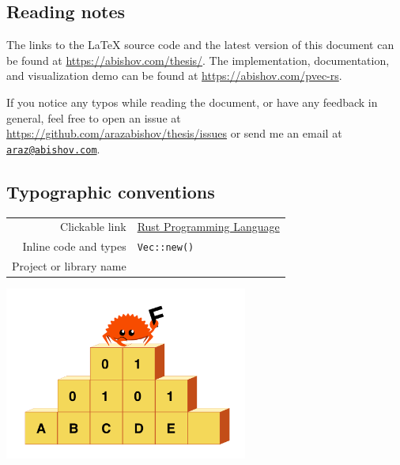 \vspace*{2cm}
\thispagestyle{plain}

\begin{center}

    \section*{Reading notes}
    \begin{justify}
        The links to the LaTeX source code and the latest version of this document can be found at \url{https://abishov.com/thesis/}. The implementation, documentation, and visualization demo can be found at \url{https://abishov.com/pvec-rs}.

        If you notice any typos while reading the document, or have any feedback in general, feel free to open an issue at \url{https://github.com/arazabishov/thesis/issues} or send me an email at \href{mailto:araz@abishov.com}{\nolinkurl{araz@abishov.com}}.
    \end{justify}

    \subsection*{Typographic conventions}
    \begin{tabular}{ r l }
        Clickable link & \href{https://www.rust-lang.org/}{Rust Programming Language} \\
        Inline code and types & \texttt{Vec::new()} \\
        Project or library name & \pvecrs{} \\
    \end{tabular}

    \vspace*{1cm}
    \includegraphics[width=8cm, angle=0, trim=10 10 10 10, clip]{images/ferris-climbing.png}
\end{center}

